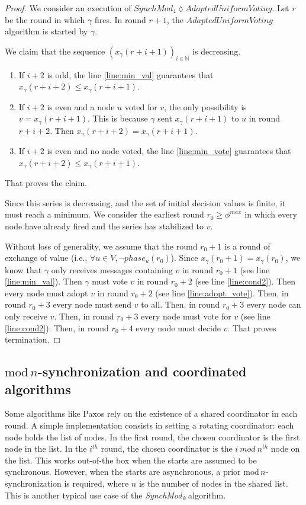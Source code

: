 \documentclass[11pt,letterpaper]{article}
\newcommand{\cent}{\gamma}
\newcommand{\SM}{{\em SynchMod}$_{\,k}\ $}
\begin{document}
\begin{proof}
	We consider an execution of $SynchMod_4 \lozenge AdaptedUniformVoting$.
	Let $r$ be the round in which $\cent$ fires.
	In round $r+1$, the $AdaptedUniformVoting$ algorithm is started by $\cent$.

	We claim that the sequence $(x_\cent(r+i+1))_{i \in \mathds{N}}$ is decreasing.
	\begin{enumerate}
		\item If $i+2$ is odd, the line \ref{line:min_val} guarantees that $x_\cent(r+i+2) \leq x_\cent(r+i+1)$.
		\item If $i+2$ is even and a node $u$ voted for $v$, the only possibility is $v = x_\cent(r+i+1)$. This is because $\cent$ sent $x_\cent(r+i+1)$ to $u$ in round $r+i+2$.
			Then $x_\cent(r+i+2) = x_\cent(r+i+1)$.
		\item If $i+2$ is even and no node voted, the line \ref{line:min_vote} guarantees that $x_\cent(r+i+2) \leq x_\cent(r+i+1)$.
	\end{enumerate}
	That proves the claim.

	Since this series is decreasing, and the set of initial decision values is finite, it must reach a minimum.
	We consider the earliest round $r_0 \geq \phi^{max}$ in which every node have already fired and the series has stabilized to $v$.

	Without loss of generality, we assume that the round $r_0+1$ is a round of exchange of value (i.e., $\forall u \in V, \neg phase_u(r_0)$).
	Since $x_\cent(r_0+1) = x_\cent(r_0)$, we know that $\cent$ only receives messages containing $v$ in round $r_0+1$ (see line \ref{line:min_val}).
	Then $\cent$ must vote $v$ in round $r_0+2$ (see line \ref{line:cond2}).
	Then every node must adopt $v$ in round $r_0+2$ (see line \ref{line:adopt_vote}).
	Then, in round $r_0+3$ every node must send $v$ to all.
	Then, in round $r_0+3$ every node can only receive $v$.
	Then, in round $r_0+3$ every node must vote for $v$ (see line \ref{line:cond2}).
	Then, in round $r_0+4$ every node must decide $v$.
	That proves termination.
\end{proof}

\subsection{$\mathrm{mod}\,n$-synchronization and coordinated algorithms}

Some algorithms like Paxos rely on the existence of a shared coordinator in each round.
A simple implementation consists in setting a rotating coordinator: 
each node holds the list of nodes. In the first round, the chosen coordinator is the first node in the list.
In the $i^{th}$ round, the chosen coordinator is the $i~mod~n^{th}$ node on the list.
This works out-of-the box when the starts are assumed to be synchronous.
However, when the starts are asynchronous, a prior $\mathrm{mod}\,n$-synchronization is required, where $n$ is the number of nodes in the shared list.
This is another typical use case of the \SM algorithm.
\end{document}
